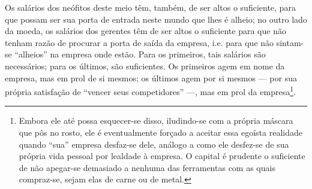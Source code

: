 \documentclass[12pt]{article}
\begin{document}
Os salários dos neófitos deste meio têm, também, de ser altos o suficiente, para que possam ser sua porta de entrada neste mundo que lhes é alheio; no outro lado da moeda, os salários dos gerentes têm de ser altos o suficiente para que não tenham razão de procurar a porta de saída da empresa, i.e. para que não sintam-se ``alheios'' na empresa onde estão. Para os primeiros, tais salários são necessários; para os últimos, são suficientes. Os primeiros agem em nome da empresa, mas em prol de si mesmos; os últimos agem por si mesmos --- por sua própria satisfação de ``vencer seus competidores'' ---, mas em prol da empresa\footnote{Embora ele até possa esquecer-se disso, iludindo-se com a própria máscara que pôs no rosto, ele é eventualmente forçado a aceitar essa egoísta realidade quando ``sua'' empresa desfaz-se dele, análogo a como ele desfez-se de sua própria vida pessoal por lealdade à empresa. O capital é prudente o suficiente de não apegar-se demasiado a nenhuma das ferramentas com as quais compraz-se, sejam elas de carne ou de metal.}.
\end{document}
